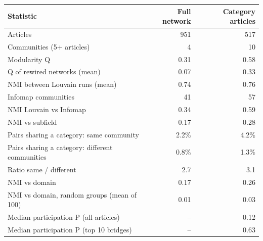 
\begin{tabular}{lrr}
\toprule
Statistic & Full network & Category articles\\
\midrule
Articles & 951 & 517\\
Communities (5+ articles) & 4 & 10\\
Modularity Q & 0.31 & 0.58\\
Q of rewired networks (mean) & 0.07 & 0.33\\
NMI between Louvain runs (mean) & 0.74 & 0.76\\
Infomap communities & 41 & 57\\
NMI Louvain vs Infomap & 0.34 & 0.59\\
NMI vs subfield & 0.17 & 0.28\\
Pairs sharing a category: same community & 2.2\% & 4.2\%\\
Pairs sharing a category: different communities & 0.8\% & 1.3\%\\
Ratio same / different & 2.7 & 3.1\\
NMI vs domain & 0.17 & 0.26\\
NMI vs domain, random groups (mean of 100) & 0.01 & 0.03\\
Median participation P (all articles) & -- & 0.12\\
Median participation P (top 10 bridges) & -- & 0.63\\
\bottomrule
\end{tabular}
